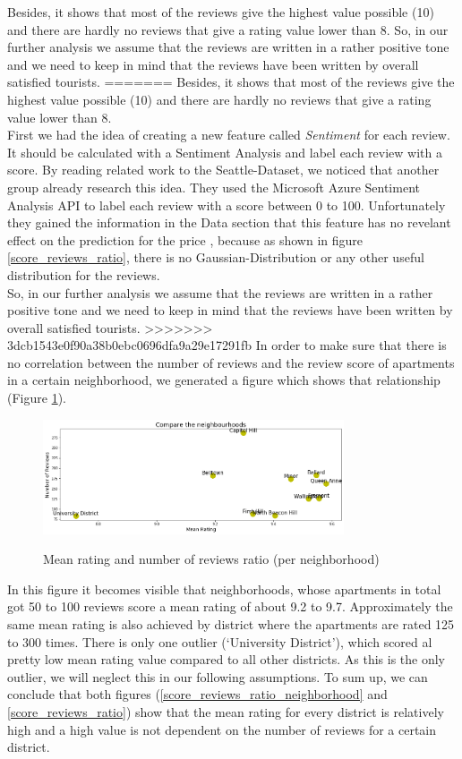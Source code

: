 Besides, it shows that most of the reviews give the highest value possible (10) and there are hardly no reviews that give a rating value lower than 8. So, in our further analysis we assume that the reviews are written in a rather positive tone and we need to keep in mind that the reviews have been written by overall satisfied tourists.
=======
Besides, it shows that most of the reviews give the highest value possible (10) and there are hardly no reviews that give a rating value lower than 8. \\
First we had the idea of creating a new feature called \textit{Sentiment} for each review. It should be calculated with a Sentiment Analysis and label each review with a score. By reading related work to the Seattle-Dataset, we noticed that another group already research this idea. They used the Microsoft Azure Sentiment Analysis API to label each review with a score between 0 to 100. Unfortunately they gained the information in the Data section that this feature has no revelant effect on the prediction for the price \cite{RN1}, because as shown in figure \ref{score_reviews_ratio}, there is no Gaussian-Distribution or any other useful distribution for the reviews. \\

So, in our further analysis we assume that the reviews are written in a rather positive tone and we need to keep in mind that the reviews have been written by overall satisfied tourists.
>>>>>>> 3dcb1543e0f90a38b0ebc0696dfa9a29e17291fb
In order to make sure that there is no correlation between the number of reviews and the review score of apartments in a certain neighborhood, we generated a figure which shows that relationship (Figure \ref{compare_the_neighbourhoods}).
%
\begin{figure}
  \begin{center}
  \includegraphics[width=3.5in]{photo/2_2_compare_the_neighbourhoods.png}\\
  \caption{Mean rating and number of reviews ratio (per neighborhood)}\label{compare_the_neighbourhoods}
  \end{center}
\end{figure}
%
In this figure it becomes visible that neighborhoods, whose apartments in total got 50 to 100 reviews score a mean rating of about 9.2 to 9.7. Approximately the same mean rating is also achieved by district where the apartments are rated 125 to 300 times. There is only one outlier (‘University District’), which scored al pretty low mean rating value compared to all other districts. As this is the only outlier, we will neglect this in our following assumptions.
To sum up, we can conclude that both figures (\ref{score_reviews_ratio_neighborhood} and \ref{score_reviews_ratio}) show that the mean rating for every district is relatively high and a high value is not dependent on the number of reviews for a certain district.

